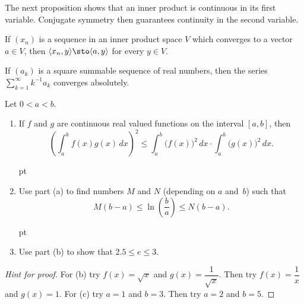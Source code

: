 The next proposition shows that an inner product is continuous in its first variable.  Conjugate symmetry then guarantees
continuity in the second variable.

\begin{prop} If $(x_n)$ is a sequence in an inner product space $V$ which converges to a
vector $a \in V$, then $\langle x_n,y \rangle \sto \langle a,y \rangle$ for every  $y \in V$.
\end{prop}

\begin{exam} If $(a_k)$ is a square summable sequence of real numbers, then the series $\sum_{k=1}^\infty k^{-1}a_k$
converges absolutely.
\end{exam}

\begin{exer} Let $0 < a < b$.
 \begin{enumerate}
  \item If $f$ and $g$ are continuous real valued functions on the
interval $[a,b]$, then
   \[\left(\int_a^b f(x)g(x)\,dx\right)^2
             \le \int_a^b\bigl(f(x)\bigr)^2\,dx \cdot
                       \int_a^b\bigl(g(x)\bigr)^2\,dx.\]

 pt

  \item Use part (a) to find numbers $M$ and $N$ (depending on $a$
and~$b$) such that
   \[M(b-a) \le \ln\left(\frac ba\right) \le N(b-a).\]

 pt

  \item Use part (b) to show that $2.5 \le e \le 3$.
 \end{enumerate}
\end{exer}

\begin{proof}[\emph{Hint for proof}] For (b) try $f(x) = \sqrt x$ and $g(x) = \dfrac1{\sqrt x}$.  Then try
$f(x) = \dfrac1x$ and $g(x) = 1$.  For (c) try $a = 1$ and $b = 3$.  Then try $a = 2$ and $b = 5$.  \ns
\end{proof}

